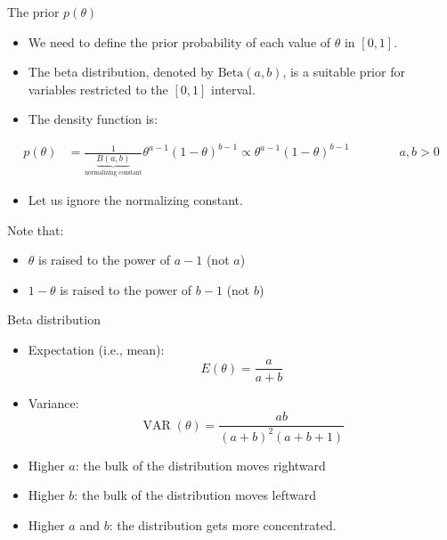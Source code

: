 \documentclass[
  13pt,
  ignorenonframetext,
]{beamer}
\providecommand{\tightlist}{%
  \setlength{\itemsep}{0pt}\setlength{\parskip}{0pt}}
\begin{document}
\begin{frame}{The prior \(p(\theta)\)}
\protect\hypertarget{the-prior-ptheta}{}
\begin{itemize}
\item
  We need to define the prior probability of each value of \(\theta\) in
  \([0, 1]\).
\item
  The beta distribution, denoted by \(\text{Beta}(a, b)\), is a suitable
  prior for variables restricted to the \([0, 1]\) interval.
\item
  The density function is:
\end{itemize}

\begin{align*}
p(\theta) & = 
\frac{1} {\underbrace{B(a,b)}_{\text{normalizing constant}}}   
\theta^{a-1}(1-\theta)^ {b-1}
\propto \theta^{a-1}(1-\theta)^ {b-1} \qquad \qquad a,b>0 
\end{align*}

\begin{itemize}
\tightlist
\item
  Let us ignore the normalizing constant.
\end{itemize}

Note that:

\begin{itemize}
\tightlist
\item
  \(\theta\) is raised to the power of \(a−1\) (not \(a\))
\item
  \(1-\theta\) is raised to the power of \(b−1\) (not \(b\))
\end{itemize}
\end{frame}

\begin{frame}{Beta distribution}
\protect\hypertarget{beta-distribution}{}
\begin{itemize}
\item
  Expectation (i.e., mean): \[E(\theta)= \frac{a}{a+b} \]
\item
  Variance: \[\operatorname{VAR}(\theta)= \frac{ab}{(a+b)^2(a+b+1)} \]
\item
  Higher \(a\): the bulk of the distribution moves rightward
\item
  Higher \(b\): the bulk of the distribution moves leftward
\item
  Higher \(a\) and \(b\): the distribution gets more concentrated.
\end{itemize}
\end{frame}
\end{document}
